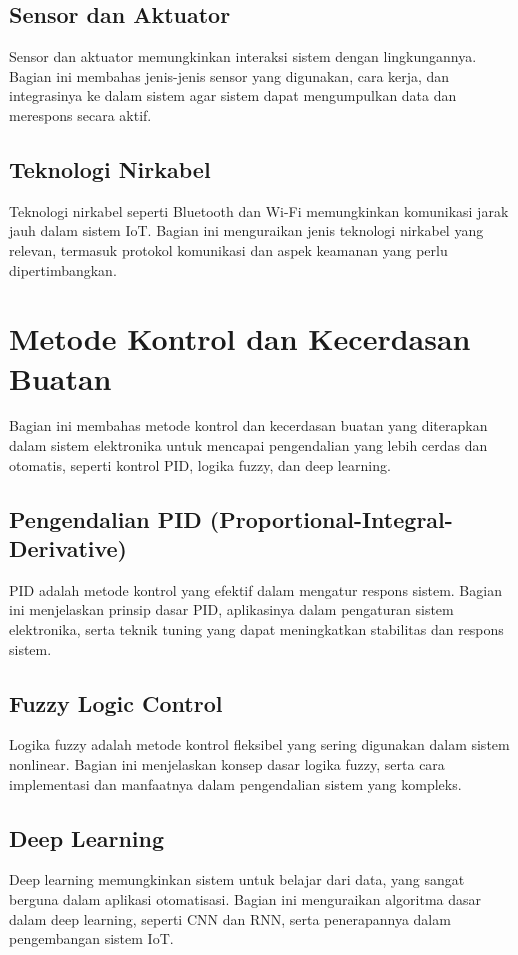 \subsection{Sensor dan Aktuator}
Sensor dan aktuator memungkinkan interaksi sistem dengan lingkungannya. Bagian ini membahas jenis-jenis sensor yang digunakan, cara kerja, dan integrasinya ke dalam sistem agar sistem dapat mengumpulkan data dan merespons secara aktif.

\subsection{Teknologi Nirkabel}
Teknologi nirkabel seperti Bluetooth dan Wi-Fi memungkinkan komunikasi jarak jauh dalam sistem IoT. Bagian ini menguraikan jenis teknologi nirkabel yang relevan, termasuk protokol komunikasi dan aspek keamanan yang perlu dipertimbangkan.

\section{Metode Kontrol dan Kecerdasan Buatan}
Bagian ini membahas metode kontrol dan kecerdasan buatan yang diterapkan dalam sistem elektronika untuk mencapai pengendalian yang lebih cerdas dan otomatis, seperti kontrol PID, logika fuzzy, dan deep learning.

\subsection{Pengendalian PID (Proportional-Integral-Derivative)}
PID adalah metode kontrol yang efektif dalam mengatur respons sistem. Bagian ini menjelaskan prinsip dasar PID, aplikasinya dalam pengaturan sistem elektronika, serta teknik tuning yang dapat meningkatkan stabilitas dan respons sistem.

\subsection{Fuzzy Logic Control}
Logika fuzzy adalah metode kontrol fleksibel yang sering digunakan dalam sistem nonlinear. Bagian ini menjelaskan konsep dasar logika fuzzy, serta cara implementasi dan manfaatnya dalam pengendalian sistem yang kompleks.

\subsection{Deep Learning}
Deep learning memungkinkan sistem untuk belajar dari data, yang sangat berguna dalam aplikasi otomatisasi. Bagian ini menguraikan algoritma dasar dalam deep learning, seperti CNN dan RNN, serta penerapannya dalam pengembangan sistem IoT.

